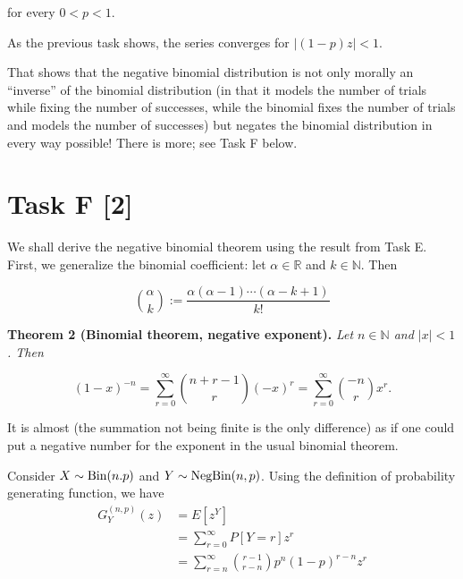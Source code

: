 for every $0<p<1$.

As the previous task shows, the series converges for $|(1-p)z|<1$.


\begin{tcolorbox}[title=]
    That shows that the negative binomial distribution is not only morally an
    \enquote{inverse} of the binomial distribution (in that it models the number
    of trials while fixing the number of successes, while the binomial fixes the
    number of trials and models the number of successes) but negates the binomial
    distribution in every way possible! There is more; see Task F below.
\end{tcolorbox}

\section*{\colS{$\S$} Task F \hfill \normalfont \large [2]}

\begin{tcolorbox}
    We shall derive the negative binomial theorem using the result from Task E.
    First, we generalize the binomial coefficient: let $\alpha \in \mathbb{R}$ and
    $k \in \mathbb{N}$. Then

    \begin{equation*}
        \binom{\alpha}{k} := \dfrac{\alpha(\alpha - 1)\cdots(\alpha - k + 1)}{k!}
    \end{equation*}
    
    \vspace{10pt}
    \begin{mdframed}[backgroundcolor=lightyellow, linecolor=darkyellow,
    linewidth=1.5pt]
        \textbf{Theorem 2 (Binomial theorem, negative exponent).}
        \textit{Let $n \in \mathbb{N}$ and $|x| < 1$. Then}

        \begin{equation*}
            (1 - x)^{-n} = \sum_{r = 0}^{\infty} \binom{n + r - 1}{r} (-x)^r
            = \sum_{r = 0}^{\infty} \binom{-n}{r} x^r.
        \end{equation*}
    \end{mdframed}

    It is almost (the summation not being finite is the only difference) as if one
    could put a negative number for the exponent in the usual binomial
    theorem.
\end{tcolorbox}


Consider $X\sim\text{Bin}(n. p)$ and $Y\sim \text{NegBin}(n, p)$. Using the definition of
probability generating function, we have
\begin{equation}
    \begin{aligned}
        G_Y^{(n, p)}(z) &= E[z^Y] \\
        &= \sum_{r=0}^{\infty}P[Y=r]z^r \\
        &= \sum_{r=n}^{\infty}\binom{r-1}{r-n}p^n(1-p)^{r-n}z^r
    \end{aligned}
    \label{e1.10}
\end{equation}

